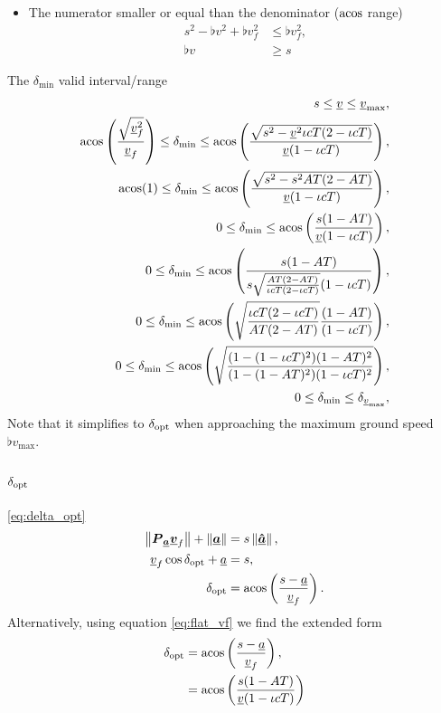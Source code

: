 \begin{itemize}
\item
The numerator smaller or equal than the denominator ($\operatorname{acos}$ range)
\begin{align*}
s^2 - \flat{v}^2 + \flat{v}_f^2 &\le \flat{v}_f^2,\\
\flat{v} &\ge s
\end{align*}
\end{itemize}


The $\delta_{\min}$ valid interval/range
\begin{align*}
s \le \flat{v} \le \flat{v}_{\max},\\
\acos\left(\frac{\sqrt{\flat{v}_f^2}}{\flat{v}_f} \right) \le \delta_{\min} \le \acos\left(\frac{\sqrt{s^2 - \flat{v}^2\iota cT(2 - \iota cT)}}{\flat{v}(1 - \iota cT)}\right),\\
\acos(1) \le \delta_{\min} \le \acos\left(\frac{\sqrt{s^2 - s^2 AT(2 - AT)}}{\flat{v}(1 - \iota cT)}\right),\\
0 \le \delta_{\min} \le \acos\left(\frac{s(1 - AT)}{\flat{v}(1 - \iota cT)}\right),\\
0 \le \delta_{\min} \le \acos\left(\frac{s(1 - AT)}{s\sqrt{\frac{AT(2 - AT)}{\iota cT(2 - \iota cT)}} (1 - \iota cT)}\right),\\
0 \le \delta_{\min} \le \acos\left(\sqrt{\frac{\iota cT(2 - \iota cT)}{AT(2 - AT)}} \frac{(1 - AT)}{(1 - \iota cT)}\right),\\
0 \le \delta_{\min} \le \acos\left(\sqrt{\frac{(1 - (1 - \iota cT)^2) (1 - AT)^2}{(1 - (1 - AT)^2) (1 - \iota cT)^2}}\right),\\
0 \le \delta_{\min} \le \delta_{\flat{v}_{\max}},\\
\end{align*}
Note that it simplifies to $\delta_{\operatorname{opt}}$ when approaching the maximum ground speed $\flat{v}_{\max}$.


\subsection{$\delta_{\operatorname{opt}}$}
\eqref{eq:delta_opt}
\begin{align*}
\norm{\projmat{\flat{a}} \vec{\flat{v}}_f} + \norm{\vec{\flat{a}}} &= s \norm{\uvec{\flat{a}}},\\
\flat{v}_f \cos\delta_{\opt} + \flat{a} &= s,\\
\delta_{\opt} &= \acos\left( \frac{s - \flat{a}}{\flat{v}_f} \right).
\end{align*}
Alternatively, using equation \eqref{eq:flat_vf} we find the extended form
\begin{align*}
\delta_{\opt} &= \acos\left( \frac{s - \flat{a}}{\flat{v}_f} \right),\\
&= \acos\left( \frac{s(1 - AT)}{\flat{v}(1 - \iota cT)} \right)
\end{align*}

